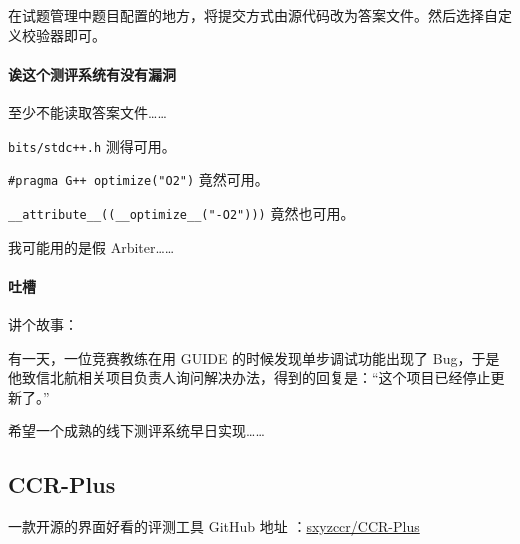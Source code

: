 在试题管理中题目配置的地方，将提交方式由源代码改为答案文件。然后选择自定义校验器即可。

\paragraph{诶这个测评系统有没有漏洞}

至少不能读取答案文件……

\texttt{bits/stdc++.h} 测得可用。

\texttt{#pragma G++ optimize("O2")} 竟然可用。

\texttt{__attribute__((__optimize__("-O2")))} 竟然也可用。

我可能用的是假 Arbiter……

\paragraph{吐槽}

讲个故事：

有一天，一位竞赛教练在用 GUIDE 的时候发现单步调试功能出现了 Bug，于是他致信北航相关项目负责人询问解决办法，得到的回复是：“这个项目已经停止更新了。”

希望一个成熟的线下测评系统早日实现……

\subsection{CCR-Plus}

一款开源的界面好看的评测工具 GitHub 地址 ：\href{https://github.com/sxyzccr/CCR-Plus}{sxyzccr/CCR-Plus}
